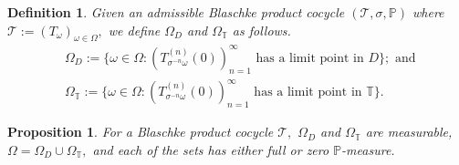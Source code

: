 \documentclass[12pt,reqno]{amsart}
\numberwithin{theorem}{section}
\newtheorem{proposition}[theorem]{Proposition}%
\newtheorem{definition}[theorem]{Definition}%
\begin{document}
\begin{definition}
    Given an admissible Blaschke product cocycle $(\mathcal{T}, \sigma, \mathbb{P})$ where  $\mathcal{T}:=(T_{\omega})_{\omega\in\Omega},$ we define $\Omega_{D}$ and $\Omega_{\mathbb{T}}$ as follows.
    \begin{align*}
        &\Omega_{D}:=\{\omega\in\Omega:(T_{\sigma^{-n}\omega}^{(n)}(0))_{n=1}^{\infty}\text{ has a limit point in } D\};\text{ and }\\&\Omega_{\mathbb{T}}:=\{\omega\in\Omega:(T_{\sigma^{-n}\omega}^{(n)}(0))_{n=1}^{\infty}\text{ has a limit point in  } \mathbb{T}\}.  
    \end{align*}
\end{definition}

\begin{proposition}\label{constant_full_measure}
    For a Blaschke product cocycle $\mathcal{T},$ $\Omega_{D}$ and $\Omega_{\mathbb{T}}$ are measurable, $\Omega=\Omega_{D}\cup\Omega_{\mathbb{T}},$ and each of the sets has either full or zero $\mathbb{P}$-measure. 
\end{proposition}
\end{document}
